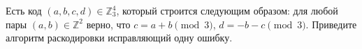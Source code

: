 Есть код $(a, b, c, d) \in \mathbb{Z}_3^4$, который строится следующим образом: для любой пары $(a, b) \in \mathbb{Z}^2$
верно, что $c = a + b \pmod{3}$, $d = -b - c \pmod{3}$. Приведите алгоритм раскодировки исправляющий одну ошибку. 
